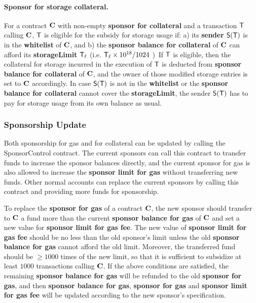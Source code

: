 \paragraph{Sponsor for storage collateral.}
For a contract $\mathbf{C}$ with non-empty {\bf sponsor for collateral} and a transaction $\textsf{T}$ calling $\mathbf{C}$,
$\textsf{T}$ is eligible for the subsidy for storage usage if: 
a) its {\bf sender} $\mathsf{S}{\left({\textsf{T}} \right)}$ is in the \textbf{whitelist} of $\mathbf{C}$, and 
b) the {\bf sponsor balance for collateral} of $\mathbf{C}$ can afford its {\bf storageLimit} $\textsf{T}_\ell$ (i.e. $\textsf{T}_\ell\times10^{18}/{1024}$ \unit).
If $\textsf{T}$ is eligible, then the collateral for storage incurred in the execution of $\textsf{T}$ 
is deducted from \textbf{sponsor balance for collateral} of $\mathbf{C}$, 
and the owner of those modified storage entries is set to $\mathbf{C}$ accordingly.
In case $\mathsf{S}{\left({\textsf{T}} \right)}$ is not in the \textbf{whitelist} or the \textbf{sponsor balance for collateral} cannot cover the {\bf storageLimit}, the sender $\mathsf{S}{\left({\textsf{T}} \right)}$ has to pay for storage usage from its own balance as usual.


\subsubsection{Sponsorship Update}

Both sponsorship for gas and for collateral can be updated by calling the SponsorControl contract.
The current sponsors can call this contract to transfer funds to increase the sponsor balances directly,
and the current sponsor for gas is also allowed to increase the \textbf{sponsor limit for gas} without transferring new funds.
Other normal accounts can replace the current sponsors by calling this contract and providing more funds for sponsorship.



To replace the \textbf{sponsor for gas} of a contract $\mathbf{C}$, the new sponsor should transfer to $\mathbf{C}$ a fund more than the current \textbf{sponsor balance for gas} of $\mathbf{C}$ and set a new value for \textbf{sponsor limit for gas fee}.
The new value of \textbf{sponsor limit for gas fee} should be no less than the old sponsor's limit  
unless the old \textbf{sponsor balance for gas} cannot afford the old limit.
Moreover, the transferred fund should be $\ge 1000$ times of the new limit, so that it is sufficient to subsidize at least $1000$  transactions calling $\mathbf{C}$. 
If the above conditions are satisfied, the remaining \textbf{sponsor balance for gas} will be refunded to the old \textbf{sponsor for gas},
and then \textbf{sponsor balance for gas}, \textbf{sponsor for gas} and \textbf{sponsor limit for gas fee} will be updated according to the new sponsor's specification.


